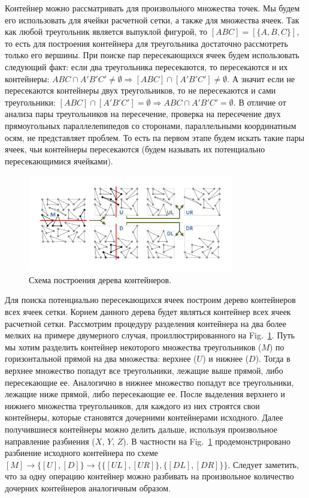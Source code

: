 Контейнер можно рассматривать для произвольного множества точек.
Мы будем его использовать для ячейки расчетной сетки, а также для множества ячеек.
Так как любой треугольник является выпуклой фигурой, то $[ABC] = [\{A, B, C\}]$, то есть для построения контейнера для треугольника достаточно рассмотреть только его вершины.
При поиске пар пересекающихся ячеек будем использовать следующий факт: если два треугольника пересекаются, то пересекаются и их контейнеры: $ABC \cap A'B'C' \ne \emptyset \Rightarrow [ABC] \cap [A'B'C'] \ne \emptyset$.
А значит если не пересекаются контейнеры двух треугольников, то не пересекаются и сами треугольники: $[ABC] \cap [A'B'C'] = \emptyset \Rightarrow ABC \cap A'B'C' = \emptyset$.
В отличие от анализа пары треугольников на пересечение, проверка на пересечение двух прямоугольных параллелепипедов со сторонами, параллельными координатным осям, не представляет проблем.
То есть па первом этапе будем искать такие пары ячеек, чьи контейнеры пересекаются (будем называть их потенциально пересекающимися ячейками).

\begin{figure}[h]
\includegraphics[width=0.8\textwidth]{pics/pic_box_size.pdf}
\caption{Схема построения дерева контейнеров.}\label{fig:pic_box}
\end{figure}

Для поиска потенциально пересекающихся ячеек построим дерево контейнеров всех ячеек сетки.
Корнем данного дерева будет являться контейнер всех ячеек расчетной сетки.
Рассмотрим процедуру разделения контейнера на два более мелких на примере двумерного случая, проиллюстрированного на Fig.~\ref{fig:pic_box}.
Путь мы хотим разделить контейнер некоторого множества треугольников ($M$) по горизонтальной прямой на два множества: верхнее ($U$) и нижнее ($D$).
Тогда в верхнее множество попадут все треугольники, лежащие выше прямой, либо пересекающие ее.
Аналогично в нижнее множество попадут все треугольники, лежащие ниже прямой, либо пересекающие ее.
После выделения верхнего и нижнего множества треугольников, для каждого из них строятся свои контейнеры, которые становятся дочерними контейнерами исходного.
Далее получившиеся контейнеры можно делить дальше, используя произвольное направление разбиения ($X$, $Y$, $Z$).
В частности на Fig.~\ref{fig:pic_box} продемонстрировано разбиение исходного контейнера по схеме $[M] \rightarrow \{[U], [D]\} \rightarrow \{\{[UL], [UR]\}, \{[DL], [DR]\}\}$.
Следует заметить, что за одну операцию контейнер можно разбивать на произвольное количество дочерних контейнеров аналогичным образом.


